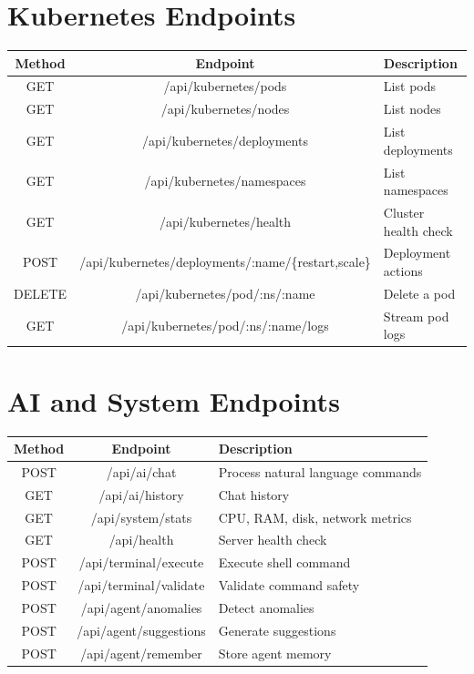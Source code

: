 \documentclass[12pt,a4paper]{report}
\begin{document}
\section{Kubernetes Endpoints}
\begin{table}[H]
\centering
\small
\begin{tabularx}{\textwidth}{c c X}
\toprule
\textbf{Method} & \textbf{Endpoint} & \textbf{Description} \\
\midrule
GET & /api/kubernetes/pods & List pods \\
GET & /api/kubernetes/nodes & List nodes \\
GET & /api/kubernetes/deployments & List deployments \\
GET & /api/kubernetes/namespaces & List namespaces \\
GET & /api/kubernetes/health & Cluster health check \\
POST & /api/kubernetes/deployments/:name/\{restart,scale\} & Deployment actions \\
DELETE & /api/kubernetes/pod/:ns/:name & Delete a pod \\
GET & /api/kubernetes/pod/:ns/:name/logs & Stream pod logs \\
\bottomrule
\end{tabularx}
\end{table}

\section{AI and System Endpoints}
\begin{table}[H]
\centering
\small
\begin{tabularx}{\textwidth}{c c X}
\toprule
\textbf{Method} & \textbf{Endpoint} & \textbf{Description} \\
\midrule
POST & /api/ai/chat & Process natural language commands \\
GET & /api/ai/history & Chat history \\
GET & /api/system/stats & CPU, RAM, disk, network metrics \\
GET & /api/health & Server health check \\
POST & /api/terminal/execute & Execute shell command \\
POST & /api/terminal/validate & Validate command safety \\
POST & /api/agent/anomalies & Detect anomalies \\
POST & /api/agent/suggestions & Generate suggestions \\
POST & /api/agent/remember & Store agent memory \\
\bottomrule
\end{tabularx}
\end{table}
\end{document}
